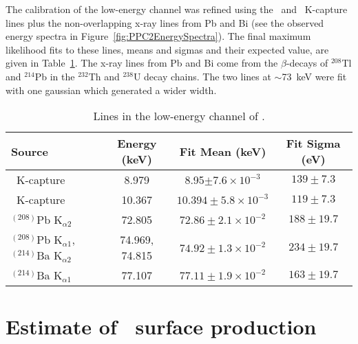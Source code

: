 	The calibration of the low-energy channel was refined using the \gersixeight~and \znsixfive~K-capture lines plus the non-overlapping x-ray lines from Pb and Bi (see the observed energy spectra in Figure~\ref{fig:PPC2EnergySpectra}).  The final maximum likelihood fits to these lines, means and sigmas and their expected value, are given in Table~\ref{tab:PPCLowEnergyLines}.  The x-ray lines from Pb and Bi come from the $\beta$-decays of $^{208}$Tl and $^{214}$Pb in the $^{232}$Th and $^{238}$U decay chains.  The two lines at $\sim$73~keV were fit with one gaussian which generated a wider width.  
				\begin{table}
					\begin{tabular}{l c c c}
						\toprule
						Source & Energy (keV) & Fit Mean (keV) & Fit Sigma (eV) \\
						\midrule						
						\znsixfive~K-capture & 8.979 & 8.95$\pm7.6\times10^{-3}$ & $139 \pm 7.3$ \\
						\gersixeight~K-capture & 10.367 & $10.394\pm5.8\times10^{-3}$ & $119 \pm 7.3$ \\
						$^{(208)}$Pb K$_{\alpha2}$ & 72.805 & $72.86\pm2.1\times10^{-2}$ & $188 \pm 19.7$ \\
						$^{(208)}$Pb K$_{\alpha1}$, $^{(214)}$Ba K$_{\alpha2}$ & 74.969, 74.815 & $74.92\pm1.3\times10^{-2}$ & $234 \pm 19.7$ \\
						$^{(214)}$Ba K$_{\alpha1}$ & 77.107& $77.11\pm1.9\times10^{-2}$ & $163 \pm 19.7$ \\		
						\bottomrule
					\end{tabular}
					\caption[Lines in the low-energy channel of .]
					{Lines in the low-energy channel of .}
					\label{tab:PPCLowEnergyLines}
				\end{table}

	\section{Estimate of \texorpdfstring{\gersixeight}{68Ge}~surface production}       
	\label{sec:Ge68ProdPPC}
	
